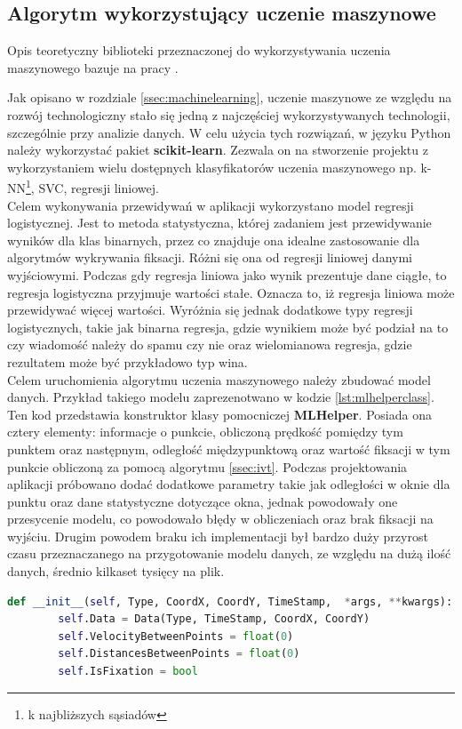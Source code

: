 \subsection{Algorytm wykorzystujący uczenie maszynowe}
\label{ssec:machinelearningalg}
Opis teoretyczny biblioteki przeznaczonej do wykorzystywania uczenia maszynowego bazuje na pracy \cite{MLPython}.\par 
Jak opisano w rozdziale \ref{ssec:machinelearning}, uczenie maszynowe ze względu na rozwój technologiczny stało się jedną z najczęściej wykorzystywanych technologii, szczególnie przy analizie danych. W celu użycia tych rozwiązań, w języku Python należy wykorzystać pakiet \textbf{scikit-learn}. Zezwala on na stworzenie projektu z wykorzystaniem wielu dostępnych klasyfikatorów uczenia maszynowego np. k-NN\footnote{k najbliższych sąsiadów}, SVC, regresji liniowej.\\
Celem wykonywania przewidywań w aplikacji wykorzystano model regresji logistycznej. Jest to metoda statystyczna, której zadaniem jest przewidywanie wyników dla klas binarnych, przez co znajduje ona idealne zastosowanie dla algorytmów wykrywania fiksacji. Różni się ona od regresji liniowej danymi wyjściowymi. Podczas gdy regresja liniowa jako wynik prezentuje dane ciągłe, to regresja logistyczna przyjmuje wartości stałe. Oznacza to, iż regresja liniowa może przewidywać więcej wartości. Wyróżnia się jednak dodatkowe typy regresji logistycznych, takie jak binarna regresja, gdzie wynikiem może być podział na to czy wiadomość należy do spamu czy nie oraz wielomianowa regresja, gdzie rezultatem może być przykładowo typ wina.\\
Celem uruchomienia algorytmu uczenia maszynowego należy zbudować model danych. Przykład takiego modelu zaprezenotwano w kodzie \ref{lst:mlhelperclass}. Ten kod przedstawia konstruktor klasy pomocniczej \textbf{MLHelper}. Posiada ona cztery elementy: informacje o punkcie, obliczoną prędkość pomiędzy tym punktem oraz następnym, odległość międzypunktową oraz wartość fiksacji w tym punkcie obliczoną za pomocą algorytmu \ref{ssec:ivt}. Podczas projektowania aplikacji próbowano dodać dodatkowe parametry takie jak odległości w oknie dla punktu oraz dane statystyczne dotyczące okna, jednak powodowały one przesycenie modelu, co powodowało błędy w obliczeniach oraz brak fiksacji na wyjściu. Drugim powodem braku ich implementacji był bardzo duży przyrost czasu przeznaczanego na przygotowanie modelu danych, ze względu na dużą ilość danych, średnio kilkaset tysięcy na plik.
\begin{lstlisting}[language=Python, caption=Konstruktor klasy pomocniczej, label={lst:mlhelperclass}]
def __init__(self, Type, CoordX, CoordY, TimeStamp,  *args, **kwargs):
        self.Data = Data(Type, TimeStamp, CoordX, CoordY)
        self.VelocityBetweenPoints = float(0)
        self.DistancesBetweenPoints = float(0)
        self.IsFixation = bool
\end{lstlisting}
